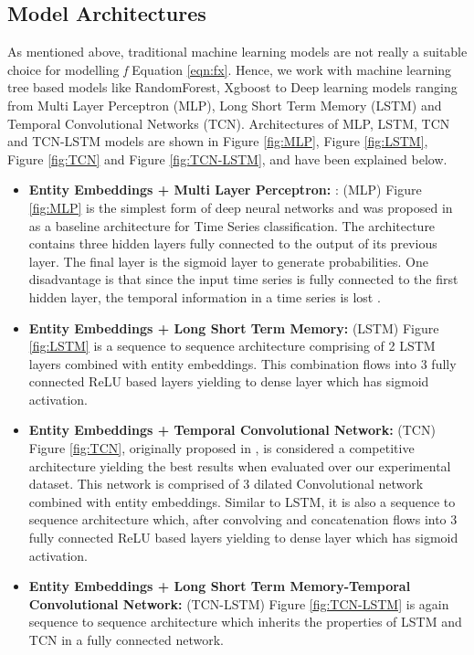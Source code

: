 \subsection{Model Architectures}
As mentioned above, traditional machine learning models are not really a suitable choice for modelling \emph{f} 
Equation \ref{eqn:fx}. Hence, we work with machine learning tree based models like RandomForest, Xgboost \cite{chen2016xgboost} 
to Deep learning models ranging from Multi Layer Perceptron (MLP), Long Short 
Term Memory (LSTM) and Temporal Convolutional Networks (TCN). Architectures of MLP, LSTM, TCN \cite{lea2016temporal} 
and TCN-LSTM \cite{karim2017lstm} models are shown in Figure \ref{fig:MLP}, Figure \ref{fig:LSTM}, Figure \ref{fig:TCN}
and Figure \ref{fig:TCN-LSTM}, and have been explained below.
\begin{itemize}
\item {\bf Entity Embeddings + Multi Layer Perceptron:} : (MLP) Figure \ref{fig:MLP} is the simplest form of deep neural networks and was 
proposed in \cite{wang2017time} as a baseline architecture for Time Series classification. The architecture contains 
three hidden layers fully connected to the output of its previous layer. The final layer 
is the sigmoid layer to generate probabilities. One disadvantage is that since the input time 
series is fully connected to the first hidden layer, the temporal information in a time series is lost \cite{fawaz2019deep1}.
\item {\bf Entity Embeddings + Long Short Term Memory:} (LSTM) Figure \ref{fig:LSTM} is a sequence to sequence \cite{sutskever2014sequence} 
architecture comprising of 2 LSTM layers combined with entity embeddings. This combination flows into 
3 fully connected ReLU based layers yielding to dense layer which has sigmoid activation.
\item {\bf Entity Embeddings + Temporal Convolutional Network:} (TCN) Figure \ref{fig:TCN}, originally
proposed in \cite{lea2016temporal} , is considered a competitive architecture yielding the best results when evaluated over 
our experimental dataset. This network is comprised of 3 dilated Convolutional network combined with entity embeddings.
Similar to LSTM, it is also a sequence to sequence architecture which, after convolving and concatenation flows into 
3 fully connected ReLU based layers yielding to dense layer which has sigmoid activation.
\item {\bf Entity Embeddings + Long Short Term Memory-Temporal Convolutional Network:} (TCN-LSTM) Figure \ref{fig:TCN-LSTM} 
is again sequence to sequence architecture which inherits the properties of LSTM and TCN in a fully 
connected network.
\end{itemize}
